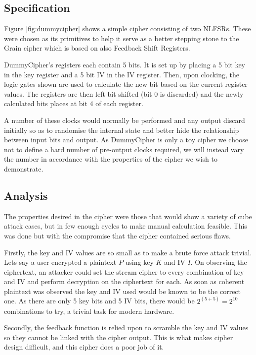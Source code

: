 \documentclass{report}
\let\Oldsubsection\subsection
\renewcommand{\subsection}{\FloatBarrier\Oldsubsection}
\begin{document}
\subsection{Specification}
Figure \ref{fig:dummycipher} shows a simple cipher consisting of two NLFSRs. These were chosen as its primitives to help it serve as a better stepping stone to the Grain cipher which is based on also Feedback Shift Registers.

DummyCipher's registers each contain 5 bits. It is set up by placing a 5 bit key in the key register and a 5 bit IV in the IV register. Then, upon clocking, the logic gates shown are used to calculate the new bit based on the current register values. The registers are then left bit shifted (bit 0 is discarded) and the newly calculated bits places at bit 4 of each register.

A number of these clocks would normally be performed and any output discard initially so as to randomise the internal state and better hide the relationship between input bits and output. As DummyCipher is only a toy cipher we choose not to define a hard number of pre-output clocks required, we will instead vary the number in accordance with the properties of the cipher we wish to demonstrate.

\subsection{Analysis}
The properties desired in the cipher were those that would show a variety of cube attack cases, but in few enough cycles to make manual calculation feasible. This was done but with the compromise that the cipher contained serious flaws.

Firstly, the key and IV values are so small as to make a brute force attack trivial. Lets say a user encrypted a plaintext $P$ using key $K$ and IV $I$. On observing the ciphertext, an attacker could set the stream cipher to every combination of key and IV and perform decryption on the ciphertext for each. As soon as coherent plaintext was observed the key and IV used would be known to be the correct one. As there are only 5 key bits and 5 IV bits, there would be $2^{(5+5)} = 2^{10}$ combinations to try, a trivial task for modern hardware.

Secondly, the feedback function is relied upon to scramble the key and IV values so they cannot be linked with the cipher output. This is what makes cipher design difficult, and this cipher does a poor job of it.
\end{document}
